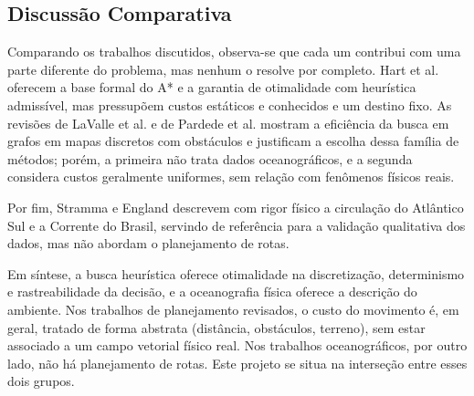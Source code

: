 \documentclass[conference]{IEEEtran}
\begin{document}
\subsection{Discussão Comparativa}
Comparando os trabalhos discutidos, observa-se que cada um contribui com uma parte diferente do problema, mas nenhum o resolve por completo. Hart et al. \cite{hart} oferecem a base formal do A* e a garantia de otimalidade com heurística admissível, mas pressupõem custos estáticos e conhecidos e um destino fixo. As revisões de LaValle et al. \cite{lavalle} e de Pardede et al. \cite{pardede} mostram a eficiência da busca em grafos em mapas discretos com obstáculos e justificam a escolha dessa família de métodos; porém, a primeira não trata dados oceanográficos, e a segunda considera custos geralmente uniformes, sem relação com fenômenos físicos reais.

Por fim, Stramma e England \cite{stramma} descrevem com rigor físico a circulação do Atlântico Sul e a Corrente do Brasil, servindo de referência para a validação qualitativa dos dados, mas não abordam o planejamento de rotas.

Em síntese, a busca heurística oferece otimalidade na discretização, determinismo e rastreabilidade da decisão, e a oceanografia física oferece a descrição do ambiente. Nos trabalhos de planejamento revisados, o custo do movimento é, em geral, tratado de forma abstrata (distância, obstáculos, terreno), sem estar associado a um campo vetorial físico real. Nos trabalhos oceanográficos, por outro lado, não há planejamento de rotas. Este projeto se situa na interseção entre esses dois grupos.
\end{document}
